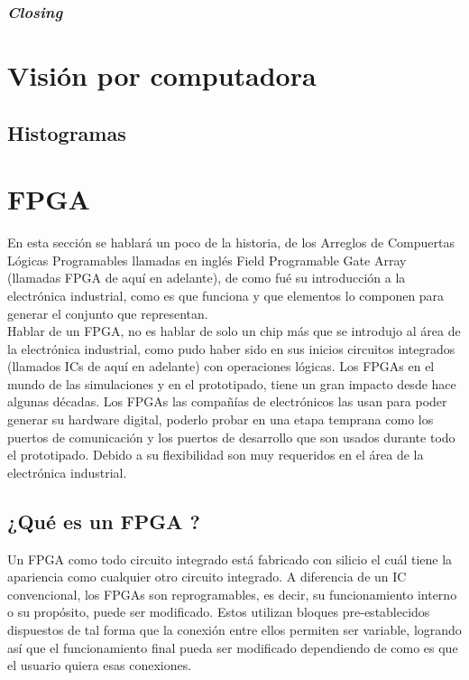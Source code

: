 \documentclass[twoside,spanish,ESP,MSc]{plantillaLabUPV}
\theoremstyle{definition}
\newcommand{\f}{FPGA }
\newcommand{\fs}{FPGAs }
\begin{document}
\subsubsection{\textit{Closing}}

\section{Visión por computadora}

\subsection{Histogramas}


\section{FPGA}
En esta sección se hablará un poco de la historia, de los Arreglos de Compuertas Lógicas Programables llamadas en inglés Field Programable Gate Array (llamadas FPGA de aquí en adelante), de como fué su introducción a la electrónica industrial, como es que funciona y que elementos lo componen para generar el conjunto que representan.\\


Hablar de un FPGA, no es hablar de solo un chip más que se introdujo al área de la electrónica industrial, como pudo haber sido en sus inicios circuitos integrados (llamados ICs de aquí en adelante) con operaciones lógicas. Los FPGAs en el mundo de las simulaciones y en el prototipado, tiene un gran impacto desde hace algunas décadas. Los FPGAs las compañías de electrónicos las usan para poder generar su hardware digital, poderlo probar en una etapa temprana como los puertos de comunicación y los puertos de desarrollo que son usados durante todo el prototipado. Debido a su flexibilidad son muy requeridos en el área de la electrónica industrial. 

\subsection*{¿Qué es un \f? }%

Un \f como todo circuito integrado está fabricado con silicio el cuál %
tiene la apariencia como cualquier otro circuito integrado. A diferencia de un IC convencional, los \fs son reprogramables, es decir, su funcionamiento interno o su propósito, puede ser modificado. Estos utilizan bloques pre-establecidos dispuestos de tal forma que la conexión entre ellos permiten ser variable, logrando así que el funcionamiento final pueda ser modificado dependiendo de como es que el usuario quiera esas conexiones.
\end{document}
